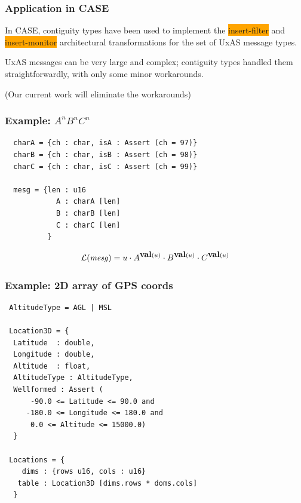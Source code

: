 \documentclass{beamer}
\newcommand{\kemph}[1]{\colorbox{orange}{#1}}
\newcommand{\konst}[1]{\ensuremath{\mbox{\bf{#1}}}}
\newcommand{\Lang}[1]{\ensuremath{{\cal L}({#1})}}
\begin{document}
\begin{frame}\frametitle{Application in CASE}

In CASE, contiguity types have been used to implement the
\kemph{insert-filter} and \kemph{insert-monitor} architectural
transformations for the set of UxAS message types.

\vspace*{5mm}

UxAS messages can be very large and complex; contiguity types handled
them straightforwardly, with only some minor workarounds.

\vspace*{5mm}
(Our current work will eliminate the workarounds)

\end{frame}

\begin{frame}[fragile]\frametitle{Example: $A^n B^n C^n$}

{\small
\begin{verbatim}
  charA = {ch : char, isA : Assert (ch = 97)}
  charB = {ch : char, isB : Assert (ch = 98)}
  charC = {ch : char, isC : Assert (ch = 99)}

  mesg = {len : u16
            A : charA [len]
            B : charB [len]
            C : charC [len]
          }
\end{verbatim}
}

\[
\Lang{\mathit{mesg}} = u \cdot A^{\konst{val}(u)} \cdot B^{\konst{val}(u)} \cdot C^{\konst{val}(u)} \]

\end{frame}


\begin{frame}[fragile]\frametitle{Example: 2D array of GPS coords}

{\small
\begin{verbatim}
 AltitudeType = AGL | MSL

 Location3D = {
  Latitude  : double,
  Longitude : double,
  Altitude  : float,
  AltitudeType : AltitudeType,
  Wellformed : Assert (
      -90.0 <= Latitude <= 90.0 and
     -180.0 <= Longitude <= 180.0 and
      0.0 <= Altitude <= 15000.0)
  }

 Locations = {
    dims : {rows u16, cols : u16}
   table : Location3D [dims.rows * doms.cols]
  }
\end{verbatim}
}
\end{frame}
\end{document}
